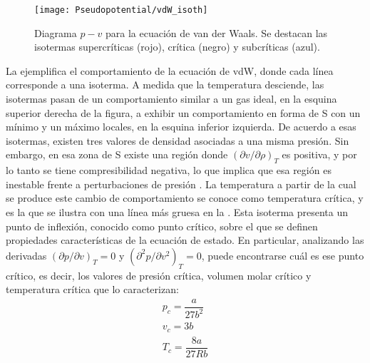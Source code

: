 \begin{figure}[ht]
	\centering
	\texttt{[image: Pseudopotential/vdW\_isoth]}
	\caption{Diagrama $p-v$ para la ecuaci\'on de van der Waals. Se destacan las isotermas supercr\'iticas (rojo), cr\'itica (negro) y subcr\'iticas (azul).}
	\label{fig:vdW_isoth}
\end{figure}

La  ejemplifica el comportamiento de la ecuaci\'on de vdW, donde cada l\'inea corresponde a una isoterma. A medida que la temperatura desciende, las isotermas pasan de un comportamiento similar a un gas ideal, en la esquina superior derecha de la figura, a exhibir un comportamiento en forma de S con un m\'inimo y un m\'aximo locales, en la esquina inferior izquierda. De acuerdo a esas isotermas, existen tres valores de densidad asociadas a una misma presi\'on. Sin embargo, en esa zona de S existe una regi\'on donde $(\partial v / \partial \rho)_T$ es positiva, y por lo tanto se tiene compresibilidad negativa, lo que implica que esa regi\'on es inestable frente a perturbaciones de presi\'on \cite{blundell_concepts_2006}.
La temperatura a partir de la cual se produce este cambio de comportamiento se conoce como temperatura cr\'itica, y es la que se ilustra con una l\'inea m\'as gruesa en la . Esta isoterma presenta un punto de inflexi\'on, conocido como punto cr\'itico, sobre el que se definen propiedades caracter\'isticas de la ecuaci\'on de estado. En particular, analizando las derivadas $(\partial p / \partial v)_T = 0$ y $(\partial^2 p / \partial v^2)_T = 0$, puede encontrarse cu\'al es ese punto cr\'itico, es decir, los valores de presi\'on cr\'itica, volumen molar cr\'itico y temperatura cr\'itica que lo caracterizan:
\begin{equation}
	\begin{gathered}
		p_c = \dfrac{a}{27 b^2} \\
		v_c = 3b \\
		T_c = \dfrac{8 a}{27 R b}
	\end{gathered}
	\label{eq:vdw_param_crit}
\end{equation}

